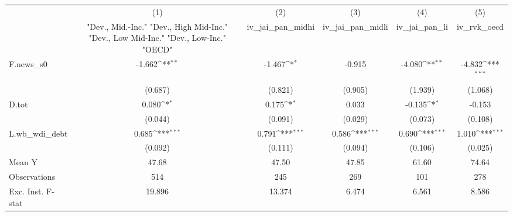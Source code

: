 {
\def\sym#1{\ifmmode^{#1}\else\(^{#1}\)\fi}
\begin{tabular}{l*{5}{c}}
\toprule
            &\multicolumn{1}{c}{(1)}&\multicolumn{1}{c}{(2)}&\multicolumn{1}{c}{(3)}&\multicolumn{1}{c}{(4)}&\multicolumn{1}{c}{(5)}\\
            &\multicolumn{1}{c}{ "Dev., Mid.-Inc." "Dev., High Mid-Inc." "Dev., Low Mid-Inc." "Dev., Low-Inc." "OECD" }&\multicolumn{1}{c}{iv\_jai\_pan\_midhi}&\multicolumn{1}{c}{iv\_jai\_pan\_midli}&\multicolumn{1}{c}{iv\_jai\_pan\_li}&\multicolumn{1}{c}{iv\_rvk\_oecd}\\
\midrule
F.news\_s0   &      -1.662\sym{**} &      -1.467\sym{*}  &      -0.915         &      -4.080\sym{**} &      -4.832\sym{***}\\
            &     (0.687)         &     (0.821)         &     (0.905)         &     (1.939)         &     (1.068)         \\
\addlinespace
D.tot       &       0.080\sym{*}  &       0.175\sym{*}  &       0.033         &      -0.135\sym{*}  &      -0.153         \\
            &     (0.044)         &     (0.091)         &     (0.029)         &     (0.073)         &     (0.108)         \\
\addlinespace
L.wb\_wdi\_debt&       0.685\sym{***}&       0.791\sym{***}&       0.586\sym{***}&       0.690\sym{***}&       1.010\sym{***}\\
            &     (0.092)         &     (0.111)         &     (0.094)         &     (0.106)         &     (0.025)         \\
\midrule
Mean Y      &       47.68         &       47.50         &       47.85         &       61.60         &       74.64         \\
Observations&         514         &         245         &         269         &         101         &         278         \\
Exc. Inst. F-stat&      19.896         &      13.374         &       6.474         &       6.561         &       8.586         \\
\bottomrule
\end{tabular}
}
